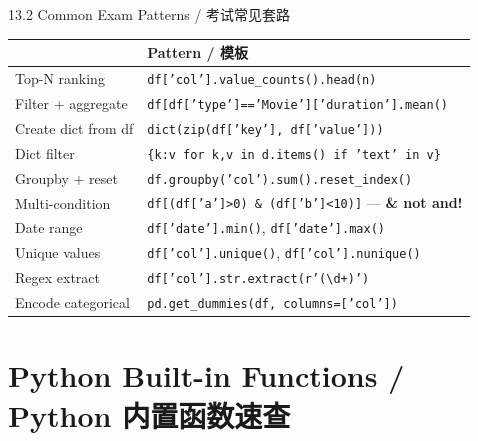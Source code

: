 \documentclass[11pt,a4paper]{report}
\let\oldtexttt\texttt
\renewcommand{\texttt}[1]{\textcolor{mainblue}{\oldtexttt{#1}}}
\begin{document}
\begin{cmdsection}{13.2  Common Exam Patterns / 考试常见套路}
\normalsize\renewcommand{\arraystretch}{1.4}
\centering
\begin{tabularx}{\textwidth}{@{}>{\ttfamily}l>{\raggedright\arraybackslash}X@{}}
\toprule
\multicolumn{1}{@{}l}{\textbf{Task / 任务}} & \textbf{Pattern / 模板} \\ \midrule
Top-N ranking       & \texttt{df['col'].value\_counts().head(n)} \\
Filter + aggregate  & \texttt{df[df['type']=='Movie']['duration'].mean()} \\
Create dict from df & \texttt{dict(zip(df['key'], df['value']))} \\
Dict filter         & \texttt{\{k:v for k,v in d.items() if 'text' in v\}} \\
Groupby + reset     & \texttt{df.groupby('col').sum().reset\_index()} \\
Multi-condition     & \texttt{df[(df['a']>0) \& (df['b']<10)]} — \textbf{\& not and!} \\
Date range          & \texttt{df['date'].min()}, \texttt{df['date'].max()} \\
Unique values       & \texttt{df['col'].unique()}, \texttt{df['col'].nunique()} \\
Regex extract       & \texttt{df['col'].str.extract(r'(\textbackslash d+)')} \\
Encode categorical  & \texttt{pd.get\_dummies(df, columns=['col'])} \\
\bottomrule
\end{tabularx}
\end{cmdsection}

\newpage

\chapter{Python Built-in Functions / Python 内置函数速查}
\end{document}
